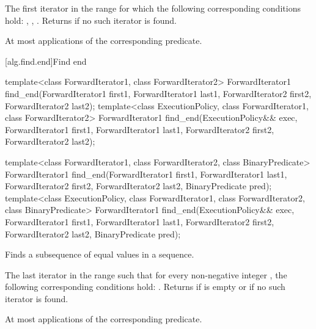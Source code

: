 \begin{itemdescr}
\pnum
\returns
The first iterator
in the range
for which the following corresponding
conditions hold:
, , .
Returns  if no such iterator is found.

\pnum
\complexity
At most
applications of the corresponding predicate.
\end{itemdescr}

[alg.find.end]{Find end}

%
\begin{itemdecl}
template<class ForwardIterator1, class ForwardIterator2>
  ForwardIterator1
    find_end(ForwardIterator1 first1, ForwardIterator1 last1,
             ForwardIterator2 first2, ForwardIterator2 last2);
template<class ExecutionPolicy, class ForwardIterator1, class ForwardIterator2>
  ForwardIterator1
    find_end(ExecutionPolicy&& exec,
             ForwardIterator1 first1, ForwardIterator1 last1,
             ForwardIterator2 first2, ForwardIterator2 last2);

template<class ForwardIterator1, class ForwardIterator2,
         class BinaryPredicate>
  ForwardIterator1
    find_end(ForwardIterator1 first1, ForwardIterator1 last1,
             ForwardIterator2 first2, ForwardIterator2 last2,
             BinaryPredicate pred);
template<class ExecutionPolicy, class ForwardIterator1, class ForwardIterator2,
         class BinaryPredicate>
  ForwardIterator1
    find_end(ExecutionPolicy&& exec,
             ForwardIterator1 first1, ForwardIterator1 last1,
             ForwardIterator2 first2, ForwardIterator2 last2,
             BinaryPredicate pred);
\end{itemdecl}

\begin{itemdescr}
\pnum
\effects
Finds a subsequence of equal values in a sequence.

\pnum
\returns
The last iterator
in the range 
such that for every non-negative integer
,
the following corresponding conditions hold:
.
Returns 
if
 is empty or if
no such iterator is found.

\pnum
\complexity
At most
applications of the corresponding predicate.
\end{itemdescr}

